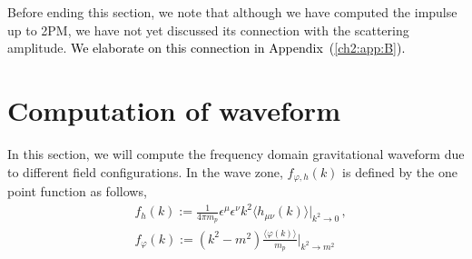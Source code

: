Before ending this section, we note that although we have computed the impulse up to 2PM, we have not yet discussed its connection with the scattering amplitude. \textcolor{black}{We elaborate on this connection in Appendix~(\ref{ch2:app:B}).}
\section{Computation of waveform}\label{ch2:sec5}
In this section, we will compute the frequency domain gravitational waveform due to different field configurations. In the wave zone, $f_{\varphi,h}(k)$ is defined by the one point function as follows,
\begin{equation}\label{e:bar}\begin{split}
&  f_{h}(k):=\frac{1}{4\pi m_p}\epsilon^{\mu}\epsilon^{\nu}k^2\langle h_{\mu\nu}(k)\rangle\Big|_{k^2\rightarrow 0}\,, \\ &
        f_{\varphi}(k) := (k^2-m^2)\frac{\langle \varphi(k)\rangle}{m_p}\Big|_{k^2\rightarrow m^2}\\
        \end{split}
\end{equation}

